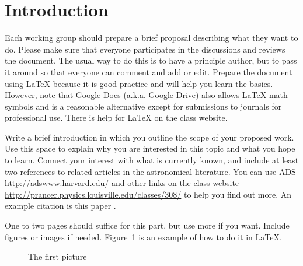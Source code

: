 \section{Introduction}


Each working group should prepare a brief proposal describing what they want 
to do.  Please make sure that everyone participates in the discussions and
reviews the document.  The usual way to do this is to have a principle author,
but to pass it around so that everyone can comment and add or edit.  Prepare the
document using \LaTeX\/ because it is good practice and will help you learn the
basics.  However, note that Google Docs (a.k.a. Google Drive) also allows
\LaTeX\/ math symbols and is a reasonable alternative except for submissions
to journals for professional use.  There is help for \LaTeX\/ on the
class website.

Write a brief introduction in which you  outline the scope of your proposed
work. Use this space to explain why you are interested in this topic and what
you hope to learn. Connect your interest with what is currently known, and
include at least two references to related articles in the astronomical
literature.  You can use ADS  \url{http://adswww.harvard.edu/} and other links
on the class website \url{http://prancer.physics.louisville.edu/classes/308/} 
to help you find out more. An example citation is this paper
\cite{yu2013accelerated, zhai2013gpu}.

One to two pages should suffice for this part, but use more if you want.  
Include figures or images if needed.  Figure~\ref{m42} is an example of  how to
do it in \LaTeX.


\begin{figure}
\begin{center}
\end{center}

\caption{The first picture\label{m42}}
\end{figure}


